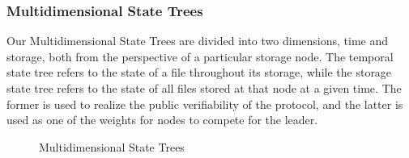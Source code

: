 \documentclass[journal]{IEEEtran}
\begin{document}
\subsubsection{Multidimensional State Trees}
Our Multidimensional State Trees are divided into two dimensions, time and storage, both from the perspective of a particular storage node. The temporal state tree refers to the state of a file throughout its storage, while the storage state tree refers to the state of all files stored at that node at a given time. The former is used to realize the public verifiability of the protocol, and the latter is used as one of the weights for nodes to compete for the leader.
\begin{figure}[htbp]
    \centering
    \caption{Multidimensional State Trees}
    \label{fig:tree} 
\end{figure}
\end{document}
